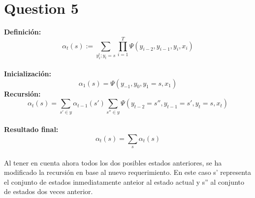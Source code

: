 \documentclass[12pt]{article}
\begin{document}
\section*{Question 5}
\textbf{Definición:}
\begin{equation*}
    \alpha_t(s) :=  \sum\limits_{ y_1^t ; y_t = s} \prod\limits_{i=1}^{T} \Psi(y_{i-2}, y_{i-1}, y_i, x_i)
\end{equation*}
\\
\textbf{Inicialización:}
\begin{equation*}
    \alpha_1(s) =  \Psi(y_{-1}, y_0, y_1 = s, x_1)
\end{equation*}
\textbf{Recursión:}
\begin{equation*}
    \alpha_t(s) =  \sum\limits_{s' \in y}  \alpha_{t-1}(s') \sum\limits_{s'' \in y} \Psi(y_{t-2} = s'', y_{t-1} = s', y_t = s, x_t)
\end{equation*}
\\
\textbf{Resultado final:}
\begin{equation*}
    \alpha_t(s) =  \sum\limits_{s}  \alpha_t(s)
\end{equation*}
\\
Al tener en cuenta ahora todos los dos posibles estados anteriores, se ha modificado la recursión en base al nuevo requerimiento. En este caso s' representa el conjunto de estados inmediatamente anteior al estado actual y s'' al conjunto de estados dos veces anterior. 

\pagebreak
\end{document}
